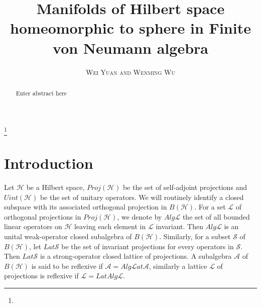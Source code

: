 \documentclass[a4paper,10pt]{amsart}
\newcommand{\HHH}{\mathcal H} %
\newcommand{\LLL}{\mathcal L} %
\newcommand{\Lat}{\mathcal Lat}
\newcommand{\titleinfo}{Manifolds of Hilbert space homeomorphic to
    sphere in Finite von Neumann algebra}
\newcommand{\authorinfo}{Wei Yuan and Wenming Wu}
\begin{document}
\title{\LARGE\textbf{\titleinfo}} 
\author{\large\textsc{\authorinfo}} 
\address{AMSS}  
\email{}

\date{}

\begin{abstract}
Enter abstract here
\end{abstract}

\keywords{}
\thanks{}
\maketitle


\section{Introduction}
Let $\HHH$ be a Hilbert space, $Proj(\HHH)$ be the set of self-adjoint projections
and $Uint(\HHH)$ be the set of unitary operators. We will routinely identify a 
closed subspace with its associated orthogonal projection in $B(\HHH)$.
For a set $\LLL$ of orthogonal projections in $Proj(\HHH)$, we denote by $Alg\LLL$ the set of all bounded linear operators on $\HHH$ leaving each element
in $\LLL$ invariant. Then $Alg\LLL$ is an unital weak-operator closed subalgebra of 
$B(\HHH)$. Similarly, for a subset $\mathcal{S}$ of
$B(\HHH)$, let $Lat\mathcal{S}$ be the set of  invariant projections for every 
operators in $\mathcal{S}$. Then $Lat\mathcal{S}$ is a
strong-operator closed lattice of projections. A subalgebra $\mathcal{A}$ of 
$B(\HHH)$ is said to be reflexive if
$\mathcal{A}=Alg\Lat\mathcal{A}$, similarly a lattice $\LLL$ of projections 
is reflexive if $\LLL=LatAlg\LLL$.
\end{document}
